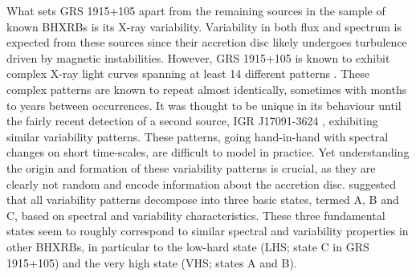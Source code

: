 \documentclass[12pt]{emulateapj}
\begin{document}
What sets GRS 1915+105 apart from the remaining sources in the sample of known BHXRBs is its X-ray variability. Variability in both flux and spectrum is expected from these sources since their accretion disc likely undergoes turbulence driven by magnetic instabilities. However, GRS 1915+105 is known to exhibit complex X-ray light curves spanning at least 14 different patterns \citep{belloni2000, kleinwolt2002, hannikainen2003, hannikainen2005}. These complex patterns are known to repeat almost identically, sometimes with months to years between occurrences. It was thought to be unique in its behaviour until the fairly recent detection of a second source, IGR J17091-3624 \citep{altamirano2011}, exhibiting similar variability patterns. 
These patterns, going hand-in-hand with spectral changes on short time-scales, are difficult to model in practice.  Yet understanding the origin and formation of these variability patterns is crucial, as they are clearly not random and encode information about the accretion disc. \citet{belloni2000} suggested that all variability patterns decompose into three basic states, termed A, B and C, based on spectral and variability characteristics. These three fundamental states seem to roughly correspond to similar spectral and variability properties in other BHXRBs, in particular to the low-hard state (LHS; state C in GRS 1915+105) and the very high state (VHS; states A and B). 
\end{document}
